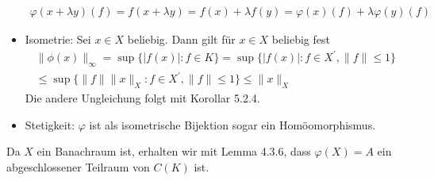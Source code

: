 \begin{solution}
\begin{itemize}
\begin{align*}
    \varphi(x + \lambda y)(f) = f(x + \lambda y) = f(x) + \lambda f(y) = \varphi(x)(f) + \lambda \varphi(y)(f)
  \end{align*}
  \item Isometrie: Sei $x \in X$ beliebig. Dann gilt für $x \in X$ beliebig fest
  \begin{align*}
    \|\phi(x)\|_{\infty} = \sup\{|f(x)|: f \in K\}
    = \sup\{|f(x)|: f \in X^{\prime}, \|f\| \leq 1\} \\
    \leq \sup\{\|f\|\|x\|_X: f \in X^{\prime}, \|f\| \leq 1\} \leq \|x\|_X
  \end{align*}
  Die andere Ungleichung folgt mit Korollar 5.2.4.
  \item Stetigkeit: $\varphi$ ist als isometrische Bijektion sogar ein Homöomorphismus.
\end{itemize}
Da $X$ ein Banachraum ist, erhalten wir mit Lemma 4.3.6, dass $\varphi(X) = A$
ein abgeschlossener Teilraum von $C(K)$ ist.
\end{solution}

